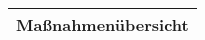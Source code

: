 \label{sec:mn_overview}
\begin{tabular}{c}
    \multicolumn{1}{p{16.64cm}}{
        \centering
        \cellcolor{\mtabellenkopfhintergrundfarbe}
        \textcolor{\mtabellenkopfschriftfarbe}{\textbf{Maßnahmenübersicht}}
    }               
    \\ \hline
\end{tabular}
